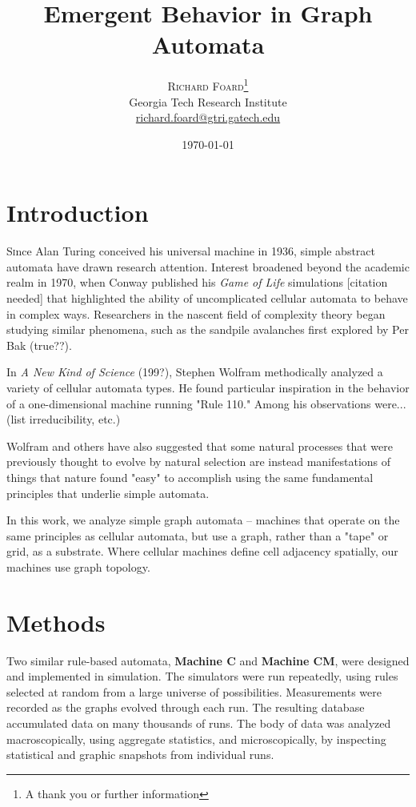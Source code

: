 \documentclass[twoside,twocolumn]{article}
\title{Emergent Behavior in Graph Automata} %
\author{%
\textsc{Richard Foard}\thanks{A thank you or further information} \\[1ex] %
\normalsize Georgia Tech Research Institute \\ %
\normalsize \href{mailto:richard.foard@gtri.gatech.edu}{richard.foard@gtri.gatech.edu} %
}
\date{\today} %
\begin{document}
\maketitle


\section{Introduction}

\lettrine[nindent=0em,lines=3]{S} ince Alan Turing conceived his
universal machine in 1936, simple abstract automata have drawn research attention.
Interest broadened beyond the academic realm in 1970,
when Conway published his \textit{Game of Life} simulations [citation needed] that highlighted the ability
of uncomplicated cellular automata to behave in complex ways. Researchers in the
nascent field of complexity theory began studying similar phenomena, such as the
sandpile avalanches first explored by Per Bak (true??).

In \textit{A New Kind of Science} (199?), Stephen Wolfram methodically analyzed
a variety of cellular automata types. He found particular inspiration in the
behavior of a one-dimensional machine running "Rule 110." Among his observations were... (list
irreducibility, etc.)

Wolfram and others have also suggested that some natural processes that were
previously thought to evolve by natural selection are instead
manifestations of things that nature found "easy" to accomplish using
the same fundamental principles that underlie simple automata.

In this work, we analyze simple graph automata -- machines that operate on the same principles as
cellular automata, but use a graph, rather than a "tape" or grid, as a substrate.
Where cellular machines define cell adjacency spatially, our machines use graph topology.


\section{Methods}

Two similar rule-based automata, \textbf{Machine C} and \textbf{Machine CM}, were designed
and implemented in simulation. The simulators were run repeatedly, using rules
selected at random from a large universe of possibilities. Measurements were recorded as the graphs
evolved through each run. The resulting database accumulated data on many thousands of runs. The body of data
was analyzed macroscopically, using aggregate statistics, and microscopically, by inspecting
statistical and graphic snapshots from individual runs.
\end{document}
